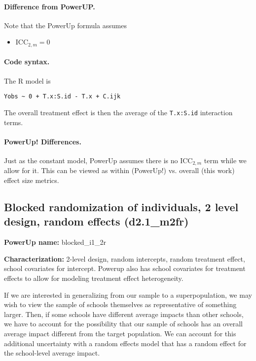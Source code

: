 \documentclass[12pt]{article}
\begin{document}
\paragraph{Difference from PowerUP.}

Note that the PowerUp formula assumes
\begin{itemize}
\item $\text{ICC}_{2,m} = 0$
\end{itemize}

\paragraph{Code syntax.}
The R model is
\begin{verbatim}
Yobs ~ 0 + T.x:S.id - T.x + C.ijk
\end{verbatim}
The overall treatment effect is then the average of the \texttt{T.x:S.id} interaction terms.

\paragraph{PowerUp! Differences.}
Just as the constant model, PowerUp assumes there is no $\text{ICC}_{2,m}$ term while we allow for it.
This can be viewed as within (PowerUp!) vs. overall (this work) effect size metrics.



\newpage 
\subsection{Blocked randomization of individuals, 2 level design, random effects (d2.1\_m2fr)}

\textbf{PowerUp name:} blocked\_i1\_2r

\textbf{Characterization:} 2-level design, random intercepts, random treatment effect, school covariates for intercept. Powerup also has school covariates for treatment effects to allow for modeling treatment effect heterogeneity.

If we are interested in generalizing from our sample to a superpopulation, we may wish to view the sample of schools themselves as representative of something larger.
Then, if some schools have different average impacts than other schools, we have to account for the possibility that our sample of schools has an overall average impact different from the target population.
We can account for this additional uncertainty with a random effects model that has a random effect for the school-level average impact.
\end{document}
